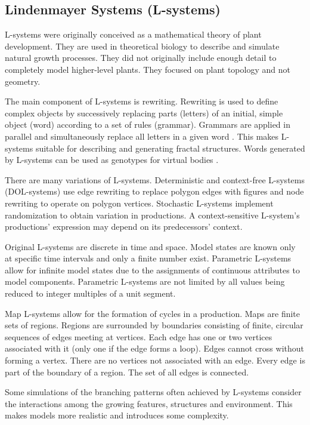 \subsection{Lindenmayer Systems (L-systems)}

L-systems were originally conceived as a mathematical theory of plant development. They are used in theoretical biology to describe and simulate natural growth processes. They did not originally include enough detail to completely model higher-level plants. They focused on plant topology and not geometry. \citep{Kolodziej2002,Prusinkiewicz2004}

The main component of L-systems is rewriting. Rewriting is used to define complex objects by successively replacing parts (letters) of an initial, simple object (word) according to a set of rules (grammar). Grammars are applied in parallel and simultaneously replace all letters in a given word \citep{Prusinkiewicz2004}. This makes L-systems suitable for describing and generating fractal structures. Words generated by L-systems can be used as genotypes for virtual bodies \citep{Kolodziej2002}.

There are many variations of L-systems. Deterministic and context-free L-systems (DOL-systems) use edge rewriting to replace polygon edges with figures and node rewriting to operate on polygon vertices. Stochastic L-systems implement randomization to obtain variation in productions. A context-sensitive L-system's productions' expression may depend on its predecessors' context.  \citep{Prusinkiewicz2004}

Original L-systems are discrete in time and space. Model states are known only at specific time intervals and only a finite number exist. Parametric L-systems allow for infinite model states due to the assignments of continuous attributes to model components. Parametric L-systems are not limited by all values being reduced to integer multiples of a unit segment. \citep{Prusinkiewicz2004}

Map L-systems allow for the formation of cycles in a production. Maps are finite sets of regions. Regions are surrounded by boundaries consisting of finite, circular sequences of edges meeting at vertices. Each edge has one or two vertices associated with it (only one if the edge forms a loop). Edges cannot cross without forming a vertex. There are no vertices not associated with an edge. Every edge is part of the boundary of a region. The set of all edges is connected. \citep{Prusinkiewicz2004}

Some simulations of the branching patterns often achieved by L-systems consider the interactions among the growing features, structures and environment. This makes models more realistic and introduces some complexity. \citep{Prusinkiewicz2004}

